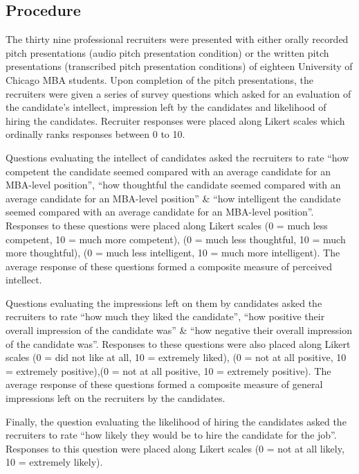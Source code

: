 \documentclass[
  english,
  man,floatsintext]{apa6}
\begin{document}
\hypertarget{procedure}{%
\subsection{Procedure}\label{procedure}}

The thirty nine professional recruiters were presented with either orally recorded pitch presentations (audio pitch presentation condition) or the written pitch presentations (transcribed pitch presentation conditions) of eighteen University of Chicago MBA students. Upon completion of the pitch presentations, the recruiters were given a series of survey questions which asked for an evaluation of the candidate's intellect, impression left by the candidates and likelihood of hiring the candidates. Recruiter responses were placed along Likert scales which ordinally ranks responses between 0 to 10.

Questions evaluating the intellect of candidates asked the recruiters to rate \enquote{how competent the candidate seemed compared with an average candidate for an MBA-level position}, \enquote{how thoughtful the candidate seemed compared with an average candidate for an MBA-level position} \& \enquote{how intelligent the candidate seemed compared with an average candidate for an MBA-level position}. Responses to these questions were placed along Likert scales (0 = much less competent, 10 = much more competent), (0 = much less thoughtful, 10 = much more thoughtful), (0 = much less intelligent, 10 = much more intelligent). The average response of these questions formed a composite measure of perceived intellect.

Questions evaluating the impressions left on them by candidates asked the recruiters to rate \enquote{how much they liked the candidate}, \enquote{how positive their overall impression of the candidate was} \& \enquote{how negative their overall impression of the candidate was}. Responses to these questions were also placed along Likert scales (0 = did not like at all, 10 = extremely liked), (0 = not at all positive, 10 = extremely positive),(0 = not at all positive, 10 = extremely positive). The average response of these questions formed a composite measure of general impressions left on the recruiters by the candidates.

Finally, the question evaluating the likelihood of hiring the candidates asked the recruiters to rate \enquote{how likely they would be to hire the candidate for the job}. Responses to this question were placed along Likert scales (0 = not at all likely, 10 = extremely likely).
\end{document}
